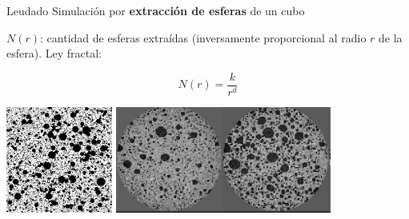 \documentclass[spanish,unknownkeysallowed]{beamer}
\begin{document}
\begin{frame}{Leudado}
Simulación por \textbf{extracción de esferas} de un cubo

$N(r)$: cantidad de esferas extraídas (inversamente proporcional al radio $r$ de la esfera). Ley fractal:

\begin{equation*}
N(r) = \frac{k}{r^{d}}
\end{equation*}

\vspace{0.3cm}
\centering
\includegraphics[height=3.5cm]{../figures/bubbles}
\includegraphics[height=3.5cm]{../figures/proving}
\end{frame}
\end{document}
